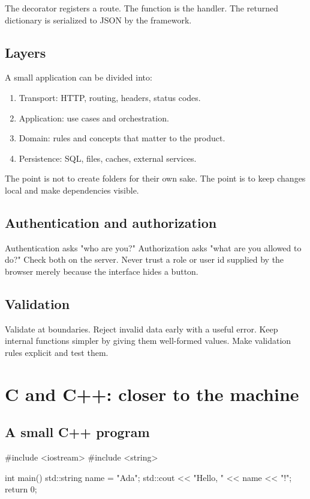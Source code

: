 \documentclass[11pt,openany,oneside]{book}
\begin{document}
The decorator registers a route. The function is the handler. The returned dictionary is serialized to JSON by the framework.

\section{Layers}

A small application can be divided into:

\begin{enumerate}
  \item Transport: HTTP, routing, headers, status codes.
  \item Application: use cases and orchestration.
  \item Domain: rules and concepts that matter to the product.
  \item Persistence: SQL, files, caches, external services.
\end{enumerate}

The point is not to create folders for their own sake. The point is to keep changes local and make dependencies visible.

\section{Authentication and authorization}

Authentication asks "who are you?" Authorization asks "what are you allowed to do?" Check both on the server. Never trust a role or user id supplied by the browser merely because the interface hides a button.

\section{Validation}

Validate at boundaries. Reject invalid data early with a useful error. Keep internal functions simpler by giving them well-formed values. Make validation rules explicit and test them.

\chapter{C and C++: closer to the machine}

\section{A small C++ program}

\begin{code}[language=C++]
#include <iostream>
#include <string>

int main() {
    std::string name = "Ada";
    std::cout << "Hello, " << name << "!\n";
    return 0;
}
\end{code}
\end{document}
